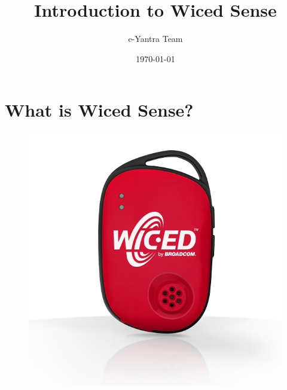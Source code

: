 \documentclass[11pt,a4paper]{article}
\begin{document}
\begin{titlepage}
\title{Introduction to Wiced Sense}
\author{e-Yantra Team}
\date{\today}
\maketitle
\end{titlepage}
 \tableofcontents

\newpage
\section{What is Wiced Sense?}
\begin{figure}[h]
    \centering
	\includegraphics[scale=0.5]{WICED_SENSE.jpg}
	\end{figure}
\end{document}
